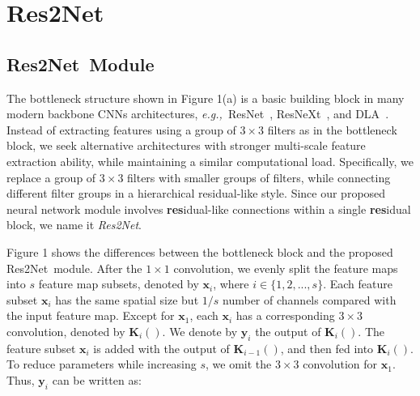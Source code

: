 \documentclass[10pt,journal,cspaper,compsoc]{IEEEtran}
\newcommand{\CheckRmv}[1]{}
\newcommand{\figref}[1]{Figure 1}%
\newcommand{\CheckRmv}[1]{#1}
\newcommand{\figref}[1]{Fig.~\ref{#1}}%
\newcommand{\ourM}{{Res2Net}}
\def\eg{\emph{e.g.,~}}
\begin{document}
\section{\ourM}

\subsection{\ourM~Module}

The bottleneck structure shown in \figref{fig:structure}(a)
is a basic building block in many modern backbone CNNs architectures,
\eg ResNet~\cite{he2016deep}, ResNeXt~\cite{xie2017aggregated},
and DLA~\cite{yu2018deep}.
%
Instead of extracting features using a group of $3 \times 3$ filters
as in the bottleneck block,
we seek alternative architectures with stronger multi-scale feature
extraction ability,
while maintaining a similar computational load.
%
Specifically, we replace a group of $3\times 3$ filters
with smaller groups of filters,
while connecting different filter groups in a hierarchical residual-like style.
%
Since our proposed neural network module involves 
\textbf{res}idual-like connections
within a single \textbf{res}idual block, we name it \emph{\ourM}.





\figref{fig:structure} shows the differences between the bottleneck block 
and the proposed \ourM~module.
%
After the $1 \times 1$ convolution,
we evenly split the feature maps into $s$ feature map subsets,
denoted by $\mathbf{x}_i$, where $i \in \{1, 2, ..., s\}$.
%
Each feature subset $\mathbf{x}_i$ has the same spatial size
but $1/s$ number of channels compared with the input feature map.
%
Except for $\mathbf{x}_1$, each $\mathbf{x}_i$ has a corresponding
$3 \times 3$ convolution,
denoted by $\mathbf{K}_i()$.
%
We denote by $\mathbf{y}_i$ the output of $\mathbf{K}_i()$.
%
The feature subset $\mathbf{x}_i$ is added with the output of
$\mathbf{K}_{i-1}()$, and then fed into $\mathbf{K}_i()$.
%
To reduce parameters while increasing $s$,
we omit the $3 \times 3$ convolution for $\mathbf{x}_1$.
Thus, $\mathbf{y}_i$ can be written as:
\CheckRmv{
\begin{eqnarray}
  \mathbf{y}_i=
  \left\{
   \begin{array}{lll}
     \mathbf{x}_i  & i=1;\\
     \mathbf{K}_i(\mathbf{x}_i) & i=2;\\
     \mathbf{K}_i(\mathbf{x}_i+ \mathbf{y}_{i-1}) & 2<i \leqslant s.
   \end{array}
   \right.
   \label{eq:out_i}
\end{eqnarray}
}
\end{document}
